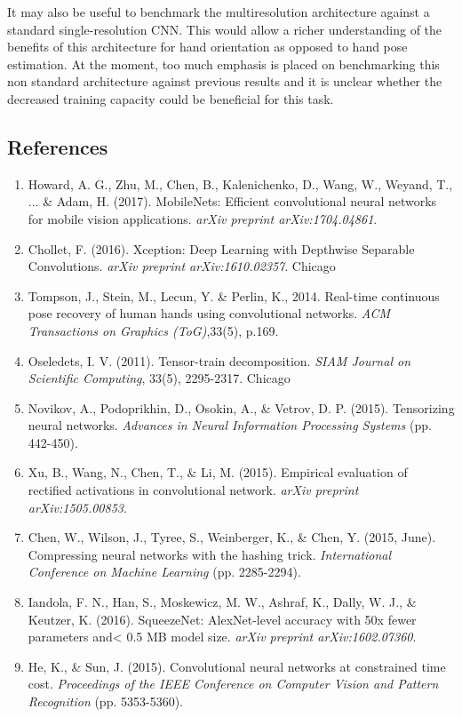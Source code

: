\documentclass{article}
\begin{document}
It may also be useful to benchmark the multiresolution architecture against a standard single-resolution CNN. This would allow a richer understanding of the benefits of this architecture for hand orientation as opposed to hand pose estimation. At the moment, too much emphasis is placed on benchmarking this non standard architecture against previous results and it is unclear whether the decreased training capacity could be beneficial for this task.



\subsection*{References}
\begin{enumerate}
\item Howard, A. G., Zhu, M., Chen, B., Kalenichenko, D., Wang, W., Weyand, T., ... \& Adam, H. (2017). MobileNets: Efficient convolutional neural networks for mobile vision applications. \emph{arXiv preprint arXiv:1704.04861}.
\item Chollet, F. (2016). Xception: Deep Learning with Depthwise Separable Convolutions. \emph{arXiv preprint arXiv:1610.02357}.
Chicago	
\item Tompson, J., Stein, M., Lecun, Y. \& Perlin, K., 2014. Real-time continuous pose recovery of human hands using convolutional networks. \emph{ACM Transactions on Graphics (ToG)},33(5), p.169.
\item Oseledets, I. V. (2011). Tensor-train decomposition. \emph{SIAM Journal on Scientific Computing}, 33(5), 2295-2317.
Chicago	
\item Novikov, A., Podoprikhin, D., Osokin, A., \& Vetrov, D. P. (2015). Tensorizing neural networks. \emph{Advances in Neural Information Processing Systems} (pp. 442-450).
\item Xu, B., Wang, N., Chen, T., \& Li, M. (2015). Empirical evaluation of rectified activations in convolutional network. \emph{arXiv preprint arXiv:1505.00853}.
\item Chen, W., Wilson, J., Tyree, S., Weinberger, K., \& Chen, Y. (2015, June). Compressing neural networks with the hashing trick. \emph{International Conference on Machine Learning} (pp. 2285-2294).
\item Iandola, F. N., Han, S., Moskewicz, M. W., Ashraf, K., Dally, W. J., \& Keutzer, K. (2016). SqueezeNet: AlexNet-level accuracy with 50x fewer parameters and< 0.5 MB model size. \emph{arXiv preprint arXiv:1602.07360}.
\item He, K., \& Sun, J. (2015). Convolutional neural networks at constrained time cost. \emph{Proceedings of the IEEE Conference on Computer Vision and Pattern Recognition} (pp. 5353-5360).

\end{enumerate}
\end{document}
